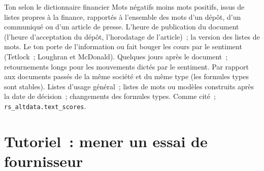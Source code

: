 \begin{predictorcard}{Ton selon le dictionnaire financier}\label{pred:rs:alternative-and-text-data:tone}
 Mots négatifs moins mots positifs, issus de listes propres à la finance, rapportés à l'ensemble des mots d'un dépôt, d'un communiqué ou d'un article de presse.
 L'heure de publication du document (l'heure d'acceptation du dépôt, l'horodatage de l'article)~; la version des
listes de mots.
 Le ton porte de l'information ou fait bouger les cours par le sentiment (Tetlock~; Loughran et McDonald).
 Quelques jours après le document~; retournements longs pour les mouvements dictés par le sentiment.
 Par rapport aux documents passés de la même société et du même type (les formules types sont stables).
 Listes d'usage général~; listes de mots ou modèles construits après la date de décision~; changements des formules types.
 Comme cité~; \texttt{rs\_altdata.text\_scores}.
\end{predictorcard}

\section{Tutoriel~: mener un essai de fournisseur}\label{tut:rs:alternative-and-text-data:tut}

